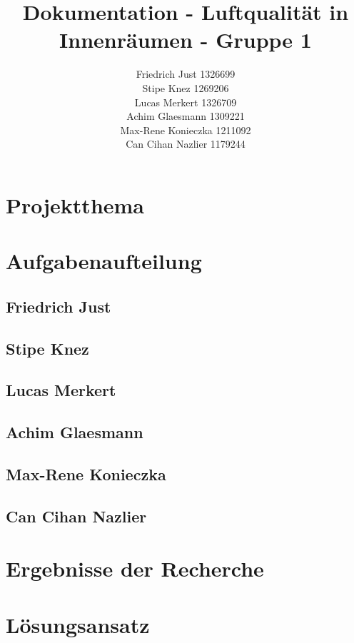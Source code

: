 \documentclass[]{article}
\title{Dokumentation - Luftqualität in Innenräumen - Gruppe 1}
\author{Friedrich Just 1326699 \\ Stipe Knez 1269206 \\ Lucas Merkert 1326709 \\ Achim Glaesmann 1309221 \\ Max-Rene Konieczka 1211092 \\ Can Cihan Nazlier 1179244}
\begin{document}
	\begin{titlepage}
		\maketitle
		\thispagestyle{empty}
	\end{titlepage}
	\tableofcontents
	\setcounter{page}{1}
	\newpage
	
	
	\section{Projektthema}
	\section{Aufgabenaufteilung} %
		\subsection{Friedrich Just}
		\subsection{Stipe Knez}
		\subsection{Lucas Merkert}
		\subsection{Achim Glaesmann}
		\subsection{Max-Rene Konieczka}
		\subsection{Can Cihan Nazlier}
	\section{Ergebnisse der Recherche}%
	\section{Lösungsansatz} %
		
\end{document}
